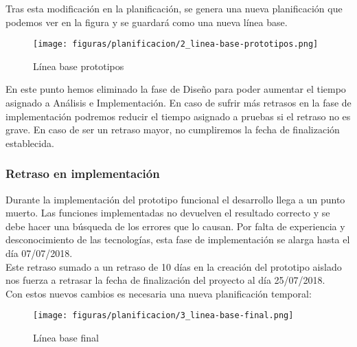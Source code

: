 Tras esta modificación en la planificación, se genera una nueva planificación que podemos ver en la figura y se guardará como una nueva línea base.

\begin{figure}[H]
    \centerline{\texttt{[image: figuras/planificacion/2\_linea-base-prototipos.png]}}
    \caption{Línea base prototipos}
\end{figure}

En este punto hemos eliminado la fase de Diseño para poder aumentar el tiempo asignado a Análisis e Implementación. En caso de sufrir más retrasos en la fase de implementación podremos reducir el tiempo asignado a pruebas si el retraso no es grave. En caso de ser un retraso mayor, no cumpliremos la fecha de finalización establecida.

\subsubsection{Retraso en implementación}

Durante la implementación del prototipo funcional el desarrollo llega a un punto muerto. Las funciones implementadas no devuelven el resultado correcto y se debe hacer una búsqueda de los errores que lo causan. Por falta de experiencia y desconocimiento de las tecnologías, esta fase de implementación se alarga hasta el día 07/07/2018. \\

Este retraso sumado a un retraso de 10 días en la creación del prototipo aislado nos fuerza a retrasar la fecha de finalización del proyecto al día 25/07/2018. \\

Con estos nuevos cambios es necesaria una nueva planificación temporal:

\begin{figure}[H]
    \centerline{\texttt{[image: figuras/planificacion/3\_linea-base-final.png]}}
    \caption{Línea base final}
\end{figure}


